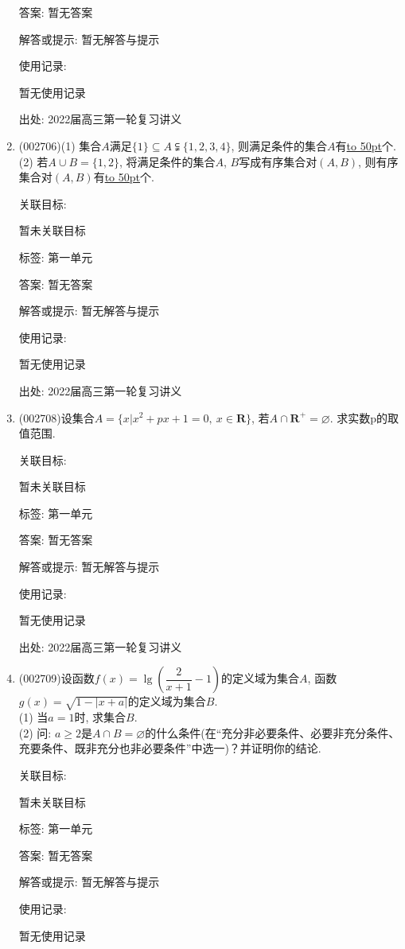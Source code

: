 \documentclass[10pt,a4paper]{article}
\newcommand{\blank}[1]{\underline{\hbox to #1pt{}}}
\begin{document}
\begin{enumerate}[1.]
答案: 暂无答案

解答或提示: 暂无解答与提示

使用记录:

暂无使用记录


出处: 2022届高三第一轮复习讲义
\item { (002706)}(1) 集合$A$满足$\{1\}\subseteq A \subsetneqq \{1,2,3,4\}$, 则满足条件的集合$A$有\blank{50}个.
(2) 若$A\cup B=\{1,2\}$, 将满足条件的集合$A$, $B$写成有序集合对$(A,B)$, 则有序集合对$(A,B)$有\blank{50}个.


关联目标:

暂未关联目标



标签: 第一单元

答案: 暂无答案

解答或提示: 暂无解答与提示

使用记录:

暂无使用记录


出处: 2022届高三第一轮复习讲义
\item { (002708)}设集合$A=\{x|x^2+px+1=0,\ x\in \mathbf{R}\}$, 若$A\cap \mathbf{R}^+=\varnothing$. 求实数p的取值范围.


关联目标:

暂未关联目标



标签: 第一单元

答案: 暂无答案

解答或提示: 暂无解答与提示

使用记录:

暂无使用记录


出处: 2022届高三第一轮复习讲义
\item { (002709)}设函数$f(x)=\lg (\dfrac2{x+1}-1)$的定义域为集合$A$, 函数$g(x)=\sqrt{1-|x+a|}$的定义域为集合$B$.\\
(1) 当$a=1$时, 求集合$B$.\\
(2) 问: $a\ge 2$是$A\cap B=\varnothing$的什么条件(在``充分非必要条件、必要非充分条件、充要条件、既非充分也非必要条件''中选一)？并证明你的结论.


关联目标:

暂未关联目标



标签: 第一单元

答案: 暂无答案

解答或提示: 暂无解答与提示

使用记录:

暂无使用记录



\end{enumerate}
\end{document}
